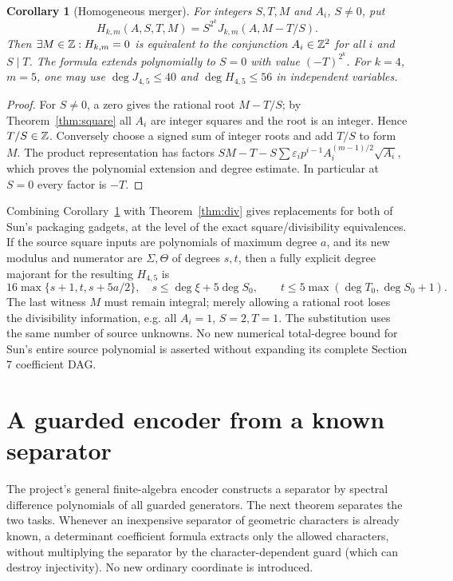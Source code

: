 \documentclass[11pt]{article}
\newtheorem{corollary}[theorem]{Corollary}
\begin{document}
\begin{corollary}[Homogeneous merger]\label{cor:H}
For integers $S,T,M$ and $A_i$, $S\ne0$, put
\[
 H_{k,m}(A,S,T,M)=S^{2^k}J_{k,m}(A,M-T/S).
\]
Then $\exists M\in\mathbb Z:H_{k,m}=0$ is equivalent to the conjunction
$A_i\in\mathbb Z^2$ for all $i$ and $S\mid T$. The formula extends polynomially
to $S=0$ with value $(-T)^{2^k}$. For $k=4$, $m=5$, one may use
$\deg J_{4,5}\le40$ and $\deg H_{4,5}\le56$ in independent variables.
\end{corollary}
\begin{proof}
For $S\ne0$, a zero gives the rational root $M-T/S$; by
Theorem~\ref{thm:square} all $A_i$ are integer squares and the root
is an integer. Hence $T/S\in\mathbb Z$. Conversely choose a signed sum of
integer roots and add $T/S$ to form $M$. The product representation
has factors $SM-T-S\sum \varepsilon_i p^{i-1}A_i^{(m-1)/2}\sqrt{A_i}$,
which proves the polynomial extension and degree estimate. In
particular at $S=0$ every factor is $-T$.
\end{proof}

Combining Corollary~\ref{cor:H} with Theorem~\ref{thm:div} gives
replacements for both of Sun's packaging gadgets, at the level of
the exact square/divisibility equivalences. If the source square inputs are
polynomials of maximum degree $a$, and its new modulus and numerator
are $\Sigma,\Theta$ of degrees $s,t$, then a fully explicit degree
majorant for the resulting $H_{4,5}$ is
\[
 16\max\{s+1,t,s+5a/2\},\quad
 s\le\deg\xi+5\deg S_0,\qquad
 t\le5\max(\deg T_0,\deg S_0+1).
\]
The last witness $M$ must remain integral; merely allowing a rational
root loses the divisibility information, e.g. all $A_i=1$,
$S=2,T=1$. The substitution uses the same number of source unknowns.
No new numerical total-degree bound for Sun's entire source polynomial
is asserted without expanding its complete Section 7 coefficient DAG.

\section{A guarded encoder from a known separator}\label{sec:guard}
The project's general finite-algebra encoder \cite{encoder} constructs
a separator by spectral difference polynomials of all guarded generators.
The next theorem separates the two tasks. Whenever an inexpensive
separator of geometric characters is already known, a determinant
coefficient formula extracts only the allowed characters, without
multiplying the separator by the character-dependent guard (which can
destroy injectivity). No new ordinary coordinate is introduced.
\end{document}
